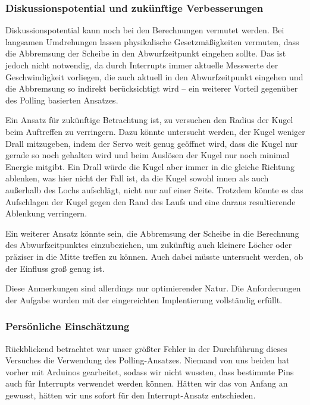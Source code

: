\documentclass{kis}
\begin{document}
\subsubsection{Diskussionspotential und zukünftige Verbesserungen}
Diskussionspotential kann noch bei den Berechnungen vermutet werden. Bei langsamen Umdrehungen lassen physikalische Gesetzmäßigkeiten vermuten, dass die Abbremsung der Scheibe in den Abwurfzeitpunkt eingehen sollte. Das ist jedoch nicht notwendig, da durch Interrupts immer aktuelle Messwerte der Geschwindigkeit vorliegen, die auch aktuell in den Abwurfzeitpunkt eingehen und die Abbremsung so indirekt berücksichtigt wird -- ein weiterer Vorteil gegenüber des Polling basierten Ansatzes.

Ein Ansatz für zukünftige Betrachtung ist, zu versuchen den Radius der Kugel beim Auftreffen zu verringern. Dazu könnte untersucht werden, der Kugel weniger Drall mitzugeben, indem der Servo weit genug geöffnet wird, dass die Kugel nur gerade so noch gehalten wird und beim Auslösen der Kugel nur noch minimal Energie mitgibt. Ein Drall würde die Kugel aber immer in die gleiche Richtung ablenken, was hier nicht der Fall ist, da die Kugel sowohl innen als auch außerhalb des Lochs aufschlägt, nicht nur auf einer Seite. Trotzdem könnte es das Aufschlagen der Kugel gegen den Rand des Laufs und eine daraus resultierende Ablenkung verringern.

Ein weiterer Ansatz könnte sein, die Abbremsung der Scheibe in die Berechnung des Abwurfzeitpunktes einzubeziehen, um zukünftig auch kleinere Löcher oder präziser in die Mitte treffen zu können. Auch dabei müsste untersucht werden, ob der Einfluss groß genug ist.

Diese Anmerkungen sind allerdings nur optimierender Natur. Die Anforderungen der Aufgabe wurden mit der eingereichten Implentierung vollständig erfüllt.


\subsubsection{Persönliche Einschätzung}
Rückblickend betrachtet war unser größter Fehler in der Durchführung dieses Versuches die Verwendung des Polling-Ansatzes. Niemand von uns beiden hat vorher mit Arduinos gearbeitet, sodass wir nicht wussten, dass bestimmte Pins auch für Interrupts verwendet werden können. Hätten wir das von Anfang an gewusst, hätten wir uns sofort für den Interrupt-Ansatz entschieden. 

\appendix
\end{document}
